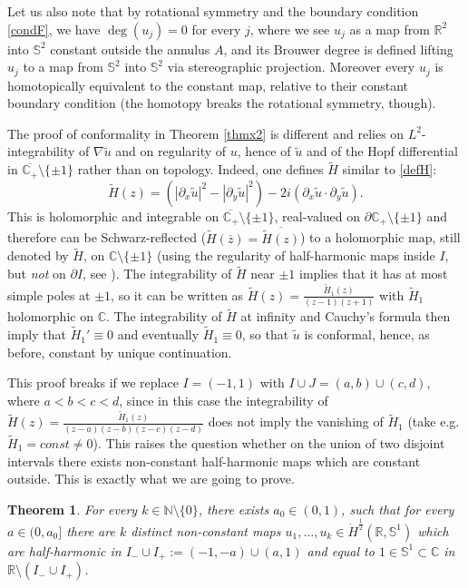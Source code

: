 \documentclass[12pt, a4paper]{article}
\newtheorem{thm}{Theorem}[section]
\newcommand{\sph}{\mathbb{S}}
\newcommand{\R}{\mathbb{R}}
\renewcommand{\(}{\left(}
\renewcommand{\)}{\right)}
\begin{document}
Let us also note that by rotational symmetry and the boundary condition \eqref{condF}, we have $\deg(u_j)=0$ for every $j$, where we see $u_j$ as a map from $\R^2$ into $\sph^2$ constant outside the annulus $A$, and its Brouwer degree is defined lifting $u_j$ to a map from $\sph^2$ into $\sph^2$ via stereographic projection. 
Moreover every $u_j$ is homotopically equivalent to the constant map, relative to their constant boundary condition (the homotopy breaks the rotational symmetry, though).


\medskip



The proof of conformality in Theorem \ref{thmx2} is different and relies on $L^2$-integrability of $\nabla\tilde u$ and on regularity of $u$, hence of $\tilde u$ and of the Hopf differential in $\overline{\mathbb{C}_+}\setminus\{\pm1\}$ rather than on topology. Indeed, one defines ${\tilde H}$ similar to \eqref{defH}:
$$\tilde H(z)=\left(|\partial_x \tilde u|^2-|\partial _y \tilde u|^2\right)-2i\left(\partial _x \tilde u\cdot \partial_y \tilde u\right).$$
This is holomorphic and integrable on $\overline{\mathbb{C}_+}\setminus\{\pm 1\}$, real-valued on $\partial \mathbb{C}_+\setminus\{\pm1\}$ and therefore can be Schwarz-reflected ($\tilde H(\overline{z})=\overline{\tilde H(z)}$) to a holomorphic map,  still denoted by $\tilde H$, on $\mathbb{C}\setminus\{\pm1\}$ (using the regularity of half-harmonic maps inside $I$, but \emph{not} on $\partial I$, see \cite{DLR2}).
The integrability of $\tilde H$ near $\pm1$ implies that it has at most simple poles at $\pm 1$, so it can be written as $\tilde H(z)=\frac{\tilde H_1(z)}{(z-1)(z+1)}$ with $\tilde H_1$ holomorphic on $\mathbb{C}$. The integrability of $\tilde H$ at infinity and Cauchy's formula then imply that $\tilde H_1'\equiv 0$ and eventually $\tilde H_1\equiv 0$, so that $\tilde u$ is conformal, hence, as before, constant by unique continuation.

This proof breaks if we replace $I=(-1,1)$ with $I\cup J=(a,b)\cup (c,d)$, where $a<b<c<d$, since in this case the integrability of $\tilde H(z)=\frac{\tilde H_1(z)}{(z-a)(z-b)(z-c)(z-d)}$ does not imply the vanishing of $\tilde H_1$ (take e.g. $\tilde H_1=const\ne 0$). This raises the question whether on the union of two disjoint intervals there exists non-constant half-harmonic maps which are constant outside. This is exactly what we are going to prove.

\begin{thm}\label{exnonconst} For every {$k\in \mathbb{N}\setminus\{0\}$}, there exists $a_0\in (0,1)$, such that for every $a\in (0,a_0]$ there are $k$ distinct non-constant maps $u_1,\dots, u_k\in \dot H^{\frac12}(\R,\sph^1)$ which are half-harmonic in $I_-\cup I_+:=(-1,-a)\cup (a,1)$  and equal to $1 \in \sph^1\subset\mathbb{C}$ in $\R\setminus (I_-\cup I_+)$.
 \end{thm}
\end{document}
